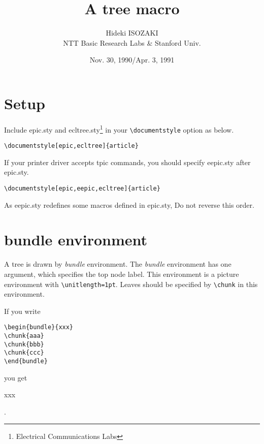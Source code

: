 
\title{A tree macro}

\author{Hideki ISOZAKI\\NTT Basic Research Labs \& Stanford Univ.}

\date{Nov. 30, 1990/Apr. 3, 1991}


\addtolength{\textwidth}{4cm}
\addtolength{\oddsidemargin}{-2cm}
\addtolength{\textheight}{4cm}
\addtolength{\topmargin}{-2cm}



\maketitle


\section{Setup}

Include epic.sty and ecltree.sty\footnote{Electrical Communications Labs}
in your \verb|\documentstyle|
option as below.
\begin{verbatim}
\documentstyle[epic,ecltree]{article}
\end{verbatim}
If your printer driver accepts tpic commands,
you should specify eepic.sty after epic.sty.
\begin{verbatim}
\documentstyle[epic,eepic,ecltree]{article}
\end{verbatim}
As eepic.sty redefines some macros defined in epic.sty,
Do not reverse this order.

\section{bundle environment}

A tree is drawn by {\it bundle} environment.
The {\it bundle} environment has one argument,
which specifies the top node label.
This environment is a picture environment with \verb|\unitlength=1pt|.
Leaves should be specified by \verb|\chunk| in this environment.

If you write
\begin{verbatim}
\begin{bundle}{xxx}
\chunk{aaa}
\chunk{bbb}
\chunk{ccc}
\end{bundle}
\end{verbatim}
you get
\begin{bundle}{xxx}
\end{bundle}.

